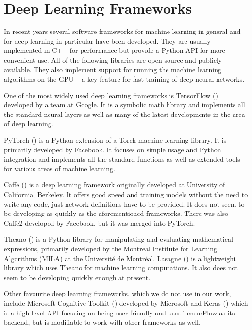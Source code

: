\section{Deep Learning Frameworks}
In recent years several software frameworks for machine learning in general and for deep learning in particular have been developed. They are usually implemented in C++ for performance but provide a Python API for more convenient use. All of the following libraries are open-source and publicly available. They also implement support for running the machine learning algorithms on the GPU -- a key feature for fast training of deep neural networks. \par
One of the most widely used deep learning frameworks is TensorFlow (\cite{martin_abadi_tensorflow:_2015}) developed by a team at Google. It is a symbolic math library and implements all the standard neural layers as well as many of the latest developments in the area of deep learning.  \par
PyTorch (\cite{paszke_automatic_2017}) is a Python extension of a Torch machine learning library. It is primarily developed by Facebook. It focuses on simple usage and Python integration and implements all the standard functions as well as extended tools for various areas of machine learning. \par
Caffe (\cite{jia_caffe:_2014}) is a deep learning framework originally developed at University of California, Berkeley. It offers good speed and training models without the need to write any code, just network definitions have to be provided. It does not seem to be developing as quickly as the aforementioned frameworks. There was also Caffe2 developed by Facebook, but it was merged into PyTorch. \par
Theano (\cite{theano_development_team_theano:_2016}) is a Python library for manipulating and evaluating mathematical expressions, primarily developed by the Montreal Institute for Learning Algorithms (MILA) at the Université de Montréal. Lasagne (\cite{dieleman_lasagne:_2015}) is a lightweight library which uses Theano for machine learning computations. It also does not seem to be developing quickly enough at present. \par
Other favourite deep learning frameworks, which we do not use in our work, include Microsoft Cognitive Toolkit (\cite{seide_cntk:_2016}) developed by Microsoft and Keras (\cite{chollet_keras_2015}) which is a high-level API focusing on being user friendly and uses TensorFlow as its backend, but is modifiable to work with other frameworks as well.

